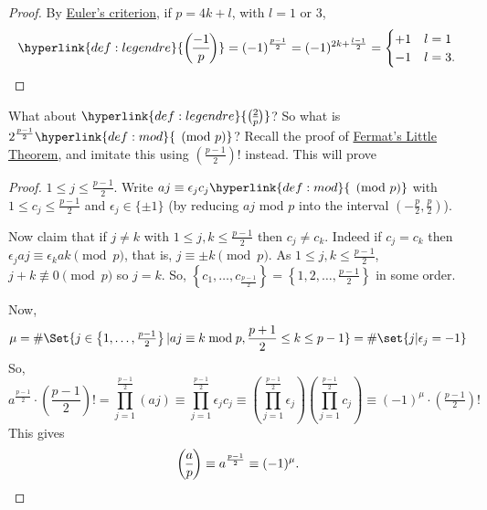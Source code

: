 \documentclass{article}
\newcommand{\legendre}[2]{\genfrac{(}{)}{}{}{#1}{#2}}
\begin{document}
\begin{proof}
    By \hyperlink{lem:eulerCriterion}{Euler's criterion}, if $p = 4k + l$, with $l = 1 $ or $3$,
    \begin{equation*}
        \hyperlink{def:legendre}{\legendre{-1}{p}} = (-1)^{\frac{p-1}{2}} = (-1)^{2k + \frac{l-1}{2}} =
        \begin{cases}
            +1 & l = 1 \\
            -1 & l = 3.
        \end{cases} \qedhere
    \end{equation*}
\end{proof}

What about $\hyperlink{def:legendre}{\legendre{2}{p}}$? So what is $2^{\frac{p-1}{2}} \hyperlink{def:mod}{\pmod{p}}$?
Recall the proof of \hyperlink{thm:fermatLittle}{Fermat's Little Theorem}, and imitate this using $\left(\frac{p-1}{2}\right)!$ instead.
This will prove


\begin{proof}
    $1 \leq j \leq \frac{p-1}{2}$.
    Write $aj \equiv \epsilon_j c_j \hyperlink{def:mod}{\pmod{p}}$ with $1 \leq c_j \leq \frac{p-1}{2}$ and $\epsilon_j \in \{\pm 1\}$ (by reducing $aj$ mod $p$ into the interval $(-\frac{p}{2}, \frac{p}{2})$).

    Now claim that if $j \neq k$ with $1 \leq j, k \leq \frac{p-1}{2}$ then $c_j \neq c_k$.
    Indeed if $c_j = c_k$ then $\epsilon_j aj \equiv \epsilon_k ak \pmod{p}$, that is, $j \equiv \pm k \pmod{p}$.
    As $1 \leq j, k \leq \frac{p-1}{2}$, $j + k \not\equiv 0 \pmod{p}$ so $j = k$.
    So, $\left\{c_1, \dotsc, c_{\frac{p-1}{2}}\right\} = \left\{1, 2, \dotsc, \frac{p-1}{2}\right\}$ in some order.

    Now,
    \begin{equation*}\mu = \#\Set{j \in \left\{1, \dotsc, \tfrac{p-1}{2}\right\} | aj \equiv k \bmod{p}, \frac{p+1}{2} \leq k \leq p-1} = \#\set{j | \epsilon_j = -1}\end{equation*}
    So,
    \begin{equation*}
        a^{\frac{p-1}{2}} \cdot \left(\frac{p-1}{2}\right)!
        = \prod_{j=1}^{\frac{p-1}{2}} (aj)
        \equiv \prod_{j=1}^{\frac{p-1}{2}} \epsilon_j c_j
        \equiv \left(\prod_{j=1}^{\frac{p-1}{2}} \epsilon_j \right) \left(\prod_{j=1}^{\frac{p-1}{2}} c_j \right)
        \equiv (-1)^\mu \cdot (\tfrac{p-1}{2})!
    \end{equation*}
    This gives
    \begin{equation*}
        \legendre{a}{p} \equiv a^{\frac{p-1}{2}} \equiv (-1)^\mu. \qedhere
    \end{equation*}
\end{proof}
\end{document}
